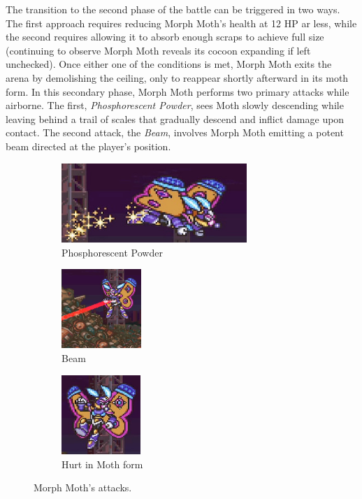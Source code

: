 The transition to the second phase of the battle can be triggered in two ways. The first approach requires reducing Morph Moth's health at 12 HP ar less, while the second requires allowing it to absorb enough scraps to achieve full size (continuing to observe Morph Moth reveals its cocoon expanding if left unchecked). Once either one of the conditions is met, Morph Moth exits the arena by demolishing the ceiling, only to reappear shortly afterward in its moth form. In this secondary phase, Morph Moth performs two primary attacks while airborne. The first, \emph{Phosphorescent Powder}, sees Moth slowly descending while leaving behind a trail of scales that gradually descend and inflict damage upon contact. The second attack, the \emph{Beam}, involves Morph Moth emitting a potent beam directed at the player's position.
\begin{figure}[htp]
	\ContinuedFloat
	\centering
	\begin{subfigure}{\linewidth}
		\centering
		\includegraphics[height=3cm]{figures/X2/Morph_moth/Moth_powder.jpg}
		\caption{Phosphorescent Powder}
	\end{subfigure}
	\begin{subfigure}{0.3\linewidth}
		\centering
		\includegraphics[height=3cm]{figures/X2/Morph_moth/Moth_beam.png}
		\caption{Beam}
	\end{subfigure}
	\begin{subfigure}{0.3\linewidth}
		\centering
		\includegraphics[height=3cm]{figures/X2/Morph_moth/Moth_hurt.jpg}
		\caption{Hurt in Moth form}
	\end{subfigure}
	\caption{Morph Moth's attacks.}
\end{figure}
